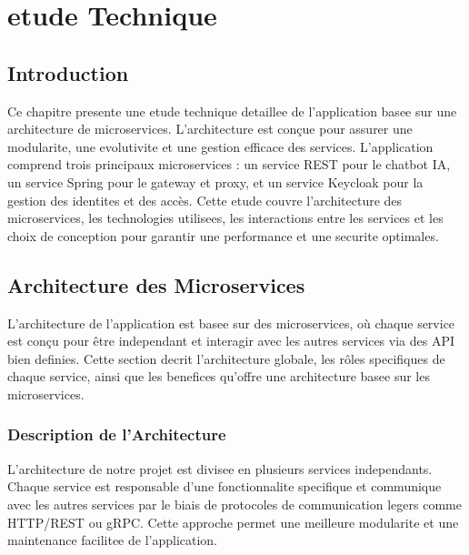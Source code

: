 \documentclass[a4paper, 11pt, openany]{report}
\begin{document}




\chapter{etude Technique}

\section{Introduction}
Ce chapitre presente une etude technique detaillee de l'application basee sur une architecture de microservices. L'architecture est conçue pour assurer une modularite, une evolutivite et une gestion efficace des services. L'application comprend trois principaux microservices : un service REST pour le chatbot IA, un service Spring pour le gateway et proxy, et un service Keycloak pour la gestion des identites et des accès. Cette etude couvre l'architecture des microservices, les technologies utilisees, les interactions entre les services et les choix de conception pour garantir une performance et une securite optimales.

\section{Architecture des Microservices}

L'architecture de l'application est basee sur des microservices, où chaque service est conçu pour être independant et interagir avec les autres services via des API bien definies. Cette section decrit l'architecture globale, les rôles specifiques de chaque service, ainsi que les benefices qu'offre une architecture basee sur les microservices.

\subsection{Description de l'Architecture}

L'architecture de notre projet est divisee en plusieurs services independants. Chaque service est responsable d'une fonctionnalite specifique et communique avec les autres services par le biais de protocoles de communication legers comme HTTP/REST ou gRPC. Cette approche permet une meilleure modularite et une maintenance facilitee de l'application.
\end{document}
